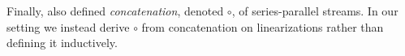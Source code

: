 %

Finally,  also defined \emph{concatenation}, denoted $\circ$, of series-parallel streams.
In our setting we instead derive $\circ$ from concatenation on linearizations rather than defining it inductively.

